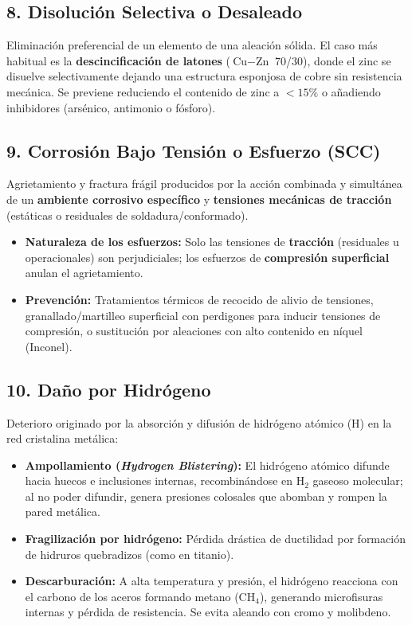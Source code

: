 \subsection{8. Disolución Selectiva o Desaleado}
Eliminación preferencial de un elemento de una aleación sólida. El caso más habitual es la \textbf{descincificación de latones} ($\text{Cu}-\text{Zn}$ 70/30), donde el zinc se disuelve selectivamente dejando una estructura esponjosa de cobre sin resistencia mecánica. Se previene reduciendo el contenido de zinc a $< 15\%$ o añadiendo inhibidores (arsénico, antimonio o fósforo).

\subsection{9. Corrosión Bajo Tensión o Esfuerzo (SCC)}
Agrietamiento y fractura frágil producidos por la acción combinada y simultánea de un \textbf{ambiente corrosivo específico} y \textbf{tensiones mecánicas de tracción} (estáticas o residuales de soldadura/conformado).
\begin{itemize}
    \item \textbf{Naturaleza de los esfuerzos:} Solo las tensiones de \textbf{tracción} (residuales u operacionales) son perjudiciales; los esfuerzos de \textbf{compresión superficial} anulan el agrietamiento.
    \item \textbf{Prevención:} Tratamientos térmicos de recocido de alivio de tensiones, granallado/martilleo superficial con perdigones para inducir tensiones de compresión, o sustitución por aleaciones con alto contenido en níquel (Inconel).
\end{itemize}

\subsection{10. Daño por Hidrógeno}
Deterioro originado por la absorción y difusión de hidrógeno atómico ($\text{H}$) en la red cristalina metálica:
\begin{itemize}
    \item \textbf{Ampollamiento (\textit{Hydrogen Blistering}):} El hidrógeno atómico difunde hacia huecos e inclusiones internas, recombinándose en $\text{H}_2$ gaseoso molecular; al no poder difundir, genera presiones colosales que abomban y rompen la pared metálica.
    \item \textbf{Fragilización por hidrógeno:} Pérdida drástica de ductilidad por formación de hidruros quebradizos (como en titanio).
    \item \textbf{Descarburación:} A alta temperatura y presión, el hidrógeno reacciona con el carbono de los aceros formando metano ($\text{CH}_4$), generando microfisuras internas y pérdida de resistencia. Se evita aleando con cromo y molibdeno.
\end{itemize}

